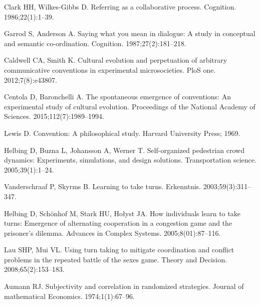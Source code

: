 \documentclass[10pt,letterpaper]{article}
\begin{document}
\begin{thebibliography}{10}

Clark HH, Wilkes-Gibbs D.
\newblock Referring as a collaborative process.
\newblock Cognition. 1986;22(1):1--39.

Garrod S, Anderson A.
\newblock Saying what you mean in dialogue: A study in conceptual and semantic
  co-ordination.
\newblock Cognition. 1987;27(2):181--218.

Caldwell CA, Smith K.
\newblock Cultural evolution and perpetuation of arbitrary communicative
  conventions in experimental microsocieties.
\newblock PloS one. 2012;7(8):e43807.

Centola D, Baronchelli A.
\newblock The spontaneous emergence of conventions: An experimental study of
  cultural evolution.
\newblock Proceedings of the National Academy of Sciences.
  2015;112(7):1989--1994.

Lewis D.
\newblock Convention: A philosophical study.
\newblock Harvard University Press; 1969.

Helbing D, Buzna L, Johansson A, Werner T.
\newblock Self-organized pedestrian crowd dynamics: Experiments, simulations,
  and design solutions.
\newblock Transportation science. 2005;39(1):1--24.

Vanderschraaf P, Skyrms B.
\newblock Learning to take turns.
\newblock Erkenntnis. 2003;59(3):311--347.

Helbing D, Sch{\"o}nhof M, Stark HU, Ho{\l}yst JA.
\newblock How individuals learn to take turns: Emergence of alternating
  cooperation in a congestion game and the prisoner's dilemma.
\newblock Advances in Complex Systems. 2005;8(01):87--116.

Lau SHP, Mui VL.
\newblock Using turn taking to mitigate coordination and conflict problems in
  the repeated battle of the sexes game.
\newblock Theory and Decision. 2008;65(2):153--183.

Aumann RJ.
\newblock Subjectivity and correlation in randomized strategies.
\newblock Journal of mathematical Economics. 1974;1(1):67--96.


\end{thebibliography}
\end{document}
